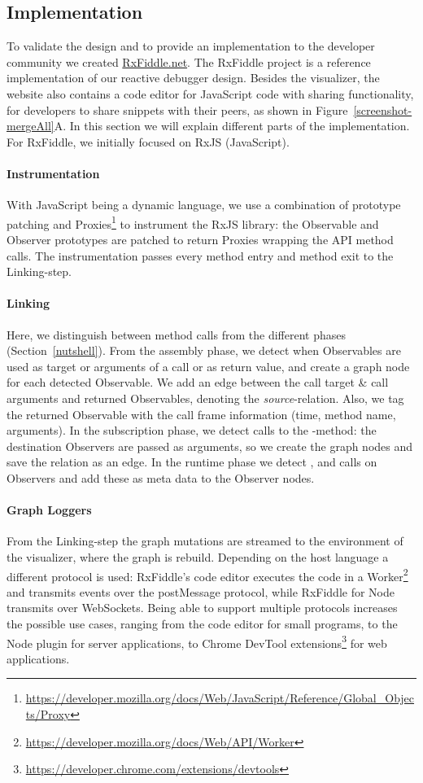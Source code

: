 \subsection{Implementation}
To validate the design and to provide an implementation to the developer community we created \url{RxFiddle.net}. The RxFiddle project is a reference implementation of 
our reactive debugger design. Besides the visualizer, the website also contains a code editor for JavaScript code with sharing functionality, for developers to share snippets with their peers, as shown in Figure~\ref{screenshot-mergeAll}A. In this section we will explain different parts of the implementation. For RxFiddle, we initially focused on RxJS (JavaScript).

\paragraph{Instrumentation}
With JavaScript being a dynamic language, we use a combination of prototype patching and Proxies\footnote{\url{https://developer.mozilla.org/docs/Web/JavaScript/Reference/Global_Objects/Proxy}} to instrument the RxJS library: the Observable and Observer prototypes are patched to return Proxies wrapping the API method calls. The instrumentation passes every method entry and method exit to the Linking-step.

\paragraph{Linking}
Here, we distinguish between method calls from the different phases (Section~\ref{nutshell}). From the assembly phase, we detect when Observables are used as target or arguments of a call or as return value, and create a graph node for each detected Observable. We add an edge between the call target \& call arguments and returned Observables, denoting the \emph{source}-relation. Also, we tag the returned Observable with the call frame information (time, method name, arguments). In the subscription phase, we detect calls to the -method: the destination Observers are passed as arguments, so we create the graph nodes and save the relation as an edge. In the runtime phase we detect ,  and  calls on Observers and add these as meta data to the Observer nodes.

\paragraph{Graph Loggers}
From the Linking-step the graph mutations are streamed to the environment of the visualizer, where the graph is rebuild. Depending on the host language a different protocol is used: RxFiddle's code editor executes the code in a Worker\footnote{\url{https://developer.mozilla.org/docs/Web/API/Worker}} and transmits events over the postMessage protocol, while RxFiddle for Node transmits over WebSockets. Being able to support multiple protocols increases the possible use cases, ranging from the code editor for small programs, to the Node plugin for server applications, to Chrome DevTool extensions\footnote{\url{https://developer.chrome.com/extensions/devtools}} for web applications.

